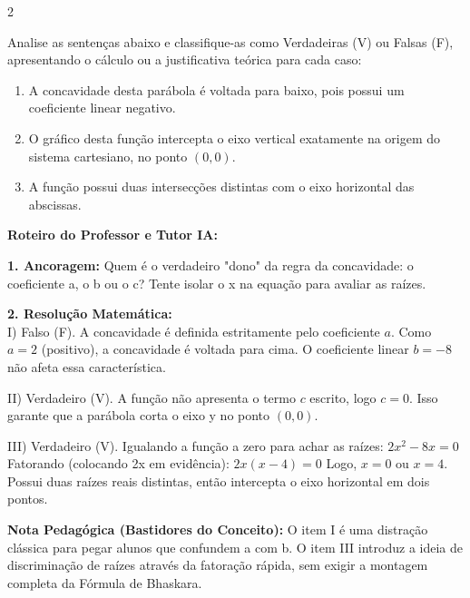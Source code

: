 \begin{multicols*}{2}
\begin{enunciadoLiteral}
Analise as sentenças abaixo e classifique-as como Verdadeiras (V) ou Falsas (F), apresentando o cálculo ou a justificativa teórica para cada caso:

\begin{enumerate}[label=\Roman*.]
    \item A concavidade desta parábola é voltada para baixo, pois possui um coeficiente linear negativo.
    \item O gráfico desta função intercepta o eixo vertical exatamente na origem do sistema cartesiano, no ponto $(0, 0)$.
    \item A função possui duas intersecções distintas com o eixo horizontal das abscissas.
\end{enumerate}
\end{enunciadoLiteral}

\ifgabarito
    \begin{tcolorbox}[colback=CorTitUm!5, colframe=CorTitUm, boxrule=1pt, arc=4pt, left=6pt, right=6pt, top=6pt, bottom=6pt]
    \small\textbf{\textcolor{CorTitUm}{Roteiro do Professor e Tutor IA:}}\par\vspace{0.1cm}
    \color{CinzaEscuro}
    \textbf{1. Ancoragem:} Quem é o verdadeiro "dono" da regra da concavidade: o coeficiente a, o b ou o c? Tente isolar o x na equação para avaliar as raízes.\par\vspace{0.1cm}
    \textbf{2. Resolução Matemática:}\\
    I) Falso (F). A concavidade é definida estritamente pelo coeficiente $a$. Como $a=2$ (positivo), a concavidade é voltada para cima. O coeficiente linear $b=-8$ não afeta essa característica.
    
    II) Verdadeiro (V). A função não apresenta o termo $c$ escrito, logo $c=0$. Isso garante que a parábola corta o eixo y no ponto $(0,0)$.
    
    III) Verdadeiro (V). Igualando a função a zero para achar as raízes:
    $2x^2 - 8x = 0$
    Fatorando (colocando 2x em evidência):
    $2x(x - 4) = 0$
    Logo, $x = 0$ ou $x = 4$. Possui duas raízes reais distintas, então intercepta o eixo horizontal em dois pontos.
    \end{tcolorbox}
    \vspace{0.15cm}
    
    \begin{boxexplicacao}
    \textbf{Nota Pedagógica (Bastidores do Conceito):} O item I é uma distração clássica para pegar alunos que confundem a com b. O item III introduz a ideia de discriminação de raízes através da fatoração rápida, sem exigir a montagem completa da Fórmula de Bhaskara.
    \end{boxexplicacao}
\fi


\end{multicols*}

